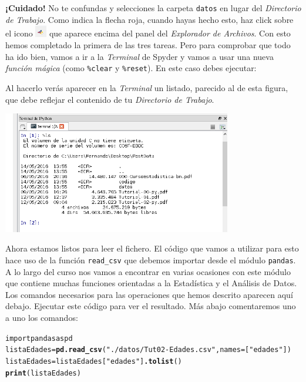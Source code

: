 \documentclass[10pt,a4paper]{article}\usepackage[]{graphicx}\usepackage[]{color}
\makeatletter
\newcommand{\hlstr}[1]{\textcolor[rgb]{0.192,0.494,0.8}{#1}}%
\newcommand{\hlkwd}[1]{\textcolor[rgb]{0.737,0.353,0.396}{\textbf{#1}}}%
\newenvironment{kframe}{%
 \def\at@end@of@kframe{}%
 \ifinner\ifhmode%
  \def\at@end@of@kframe{\end{minipage}}%
  \begin{minipage}{\columnwidth}%
 \fi\fi%
 \def\FrameCommand##1{\hskip\@totalleftmargin \hskip-\fboxsep
 \colorbox{shadecolor}{##1}\hskip-\fboxsep
     \hskip-\linewidth \hskip-\@totalleftmargin \hskip\columnwidth}%
 \MakeFramed {\advance\hsize-\width
   \@totalleftmargin\z@ \linewidth\hsize
   \@setminipage}}%
 {\par\unskip\endMakeFramed%
 \at@end@of@kframe}
\newenvironment{knitrout}{}{} %
\newcounter {cont01}
\makeatother
\begin{document}
{\bf ¡Cuidado!} No te confundas y selecciones la carpeta {\tt datos} en lugar del {\em Directorio de Trabajo}. Como indica la flecha roja, cuando hayas hecho esto, haz click sobre el icono \includegraphics[width=0.5cm]{../fig/Tut-02-py-36-IconoSeleccionWorkDir.png}
que aparece encima del panel del {\em Explorador de Archivos}. Con esto hemos completado la primera de las tres tareas. Pero para comprobar que todo ha ido bien, vamos a ir a la {\em Terminal} de Spyder y vamos a usar una nueva {\em función mágica} (como \verb&%clear& 
y \verb&%reset&). 
En este caso debes ejecutar:
\begin{knitrout}
\color{fgcolor}\begin{kframe}
\begin{alltt}
\end{alltt}
\end{kframe}
\end{knitrout}
Al hacerlo verás aparecer en la {\em Terminal} un listado, parecido al de esta figura, que debe reflejar el contenido de tu {\em Directorio de Trabajo}.
\begin{center}
\includegraphics[width=10cm]{../fig/Tut-02-py-37-FuncionMagicaLs.png}
\end{center}
Ahora estamos listos para leer el fichero. El código que vamos a utilizar para esto hace uso de la función \verb#read_csv# que debemos importar desde el módulo {\tt pandas}. A lo largo del curso nos vamos a encontrar en varias ocasiones con este módulo que contiene muchas funciones orientadas a la Estadística y el Análisis de Datos. Los comandos necesarios para las operaciones que hemos descrito aparecen aquí debajo. Ejecutar este código para ver el resultado. Más abajo comentaremos uno a uno los comandos:
\begin{knitrout}
\color{fgcolor}\begin{kframe}
\begin{alltt}
import pandas as pd
listaEdades = \hlkwd{pd.read_csv}(\hlstr{"./datos/Tut02-Edades.csv"}, names=[\hlstr{"edades"}])
listaEdades = listaEdades[\hlstr{"edades"}]\hlkwd{.tolist}()
\hlkwd{print}(listaEdades)
\end{alltt}
\end{kframe}
\end{knitrout}
\end{document}
